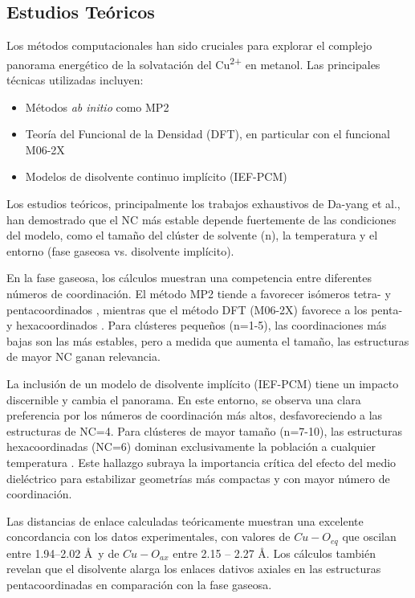     \subsection*{Estudios Teóricos}

    Los métodos computacionales han sido cruciales para explorar el complejo panorama energético de la solvatación del Cu\textsuperscript{2+} en metanol. Las principales técnicas utilizadas incluyen:
    \begin{itemize}
        \item Métodos \textit{ab initio} como MP2 
        \item Teoría del Funcional de la Densidad (DFT), en particular con el funcional M06-2X
        \item Modelos de disolvente continuo implícito (IEF-PCM)
    \end{itemize}

    Los estudios teóricos, principalmente los trabajos exhaustivos de Da-yang et al., han demostrado que el NC más estable depende fuertemente de las condiciones del modelo, como el tamaño del clúster de solvente (n), la temperatura y el entorno (fase gaseosa vs. disolvente implícito).

    En la fase gaseosa, los cálculos muestran una competencia entre diferentes números de coordinación. El método MP2 tiende a favorecer isómeros tetra- y pentacoordinados \cite{Me-2022-01}, mientras que el método DFT (M06-2X) favorece a los penta- y hexacoordinados \cite{Me-2023-01}. Para clústeres pequeños (n=1-5), las coordinaciones más bajas son las más estables, pero a medida que aumenta el tamaño, las estructuras de mayor NC ganan relevancia.

    La inclusión de un modelo de disolvente implícito (IEF-PCM) tiene un impacto discernible y cambia el panorama. En este entorno, se observa una clara preferencia por los números de coordinación más altos, desfavoreciendo a las estructuras de NC=4. Para clústeres de mayor tamaño (n=7-10), las estructuras hexacoordinadas (NC=6) dominan exclusivamente la población a cualquier temperatura \cite{Me-2023-02}. Este hallazgo subraya la importancia crítica del efecto del medio dieléctrico para estabilizar geometrías más compactas y con mayor número de coordinación.

    Las distancias de enlace calculadas teóricamente muestran una excelente concordancia con los datos experimentales, con valores de $Cu-O_{eq}$ que oscilan entre 1.94--2.02 \AA \ y de $Cu-O_{ax}$ entre 2.15 -- 2.27 \AA. Los cálculos también revelan que el disolvente alarga los enlaces dativos axiales en las estructuras pentacoordinadas en comparación con la fase gaseosa.

